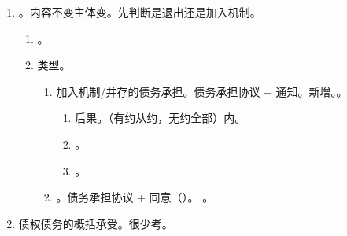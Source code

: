 \begin{enumerate}
\begin{enumerate}
        \end{enumerate}
  \item {}。内容不变主体变。先判断是退出还是加入机制。
        \begin{enumerate}
          \item {}。
          \item 类型。
                \begin{enumerate}
                  \item 加入机制/并存的债务承担。债务承担协议 + 通知。新增。。
                        \begin{enumerate}
                          \item 后果。（有约从约，无约全部）内。
                          \item {}。
                          \item {}。
                        \end{enumerate}
                  \item {}。债务承担协议 + 同意（）。
                        。
                \end{enumerate}
        \end{enumerate}
  \item 债权债务的概括承受。很少考。
\end{enumerate}
